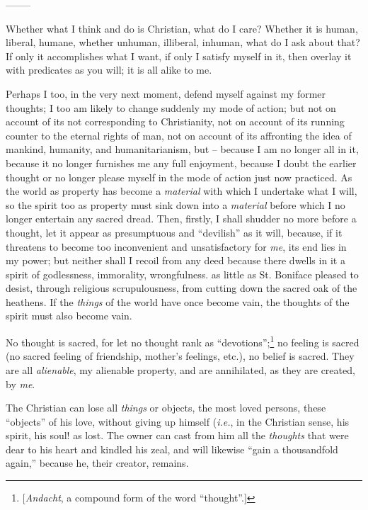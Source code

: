 \documentclass[12pt,a4paper]{book}
\begin{document}
\begin{center}
--------\end{center}


Whether what I think and do is Christian, what do I care? Whether it is human, 
liberal, humane, whether unhuman, illiberal, inhuman, what do I ask about 
that? If only it accomplishes what I want, if only I satisfy myself in it, 
then overlay it with predicates as you will; it is all alike to me.

Perhaps I too, in the very next moment, defend myself against my former 
thoughts; I too am likely to change suddenly my mode of action; but not on 
account of its not corresponding to Christianity, not on account of its 
running counter to the eternal rights of man, not on account of its affronting 
the idea of mankind, humanity, and humanitarianism, but -- because I am no 
longer all in it, because it no longer furnishes me any full enjoyment, 
because I doubt the earlier thought or no longer please myself in the mode of 
action just now practiced. As the world as property has become a 
\textit{material} with which I undertake what I will, so the spirit too as 
property must sink down into a \textit{material} before which I no longer 
entertain any sacred dread. Then, firstly, I shall shudder no more before a 
thought, let it appear as presumptuous and ``devilish'' as it will, because, 
if it threatens to become too inconvenient and unsatisfactory for \textit{me}, 
its end lies in my power; but neither shall I recoil from any deed because 
there dwells in it a spirit of godlessness, immorality, wrongfulness. as 
little as St. Boniface pleased to desist, through religious scrupulousness, 
from cutting down the sacred oak of the heathens. If the \textit{things} of 
the world have once become vain, the thoughts of the spirit must also become 
vain.

No thought is sacred, for let no thought rank as 
``devotions'';\footnote{[\textit{Andacht}, a compound form of the word 
``thought''.]} no feeling is sacred (no sacred feeling of friendship, 
mother's feelings, etc.), no belief is sacred. They are all 
\textit{alienable}, my alienable property, and are annihilated, as they are 
created, by \textit{me}.

The Christian can lose all \textit{things} or objects, the most loved persons, 
these ``objects'' of his love, without giving up himself (\textit{i.e.}, in 
the Christian sense, his spirit, his soul! as lost. The owner can cast from 
him all the \textit{thoughts} that were dear to his heart and kindled his 
zeal, and will likewise ``gain a thousandfold again,'' because he, their 
creator, remains.
\end{document}
